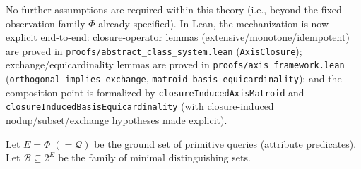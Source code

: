 No further assumptions are required within this theory (i.e., beyond the fixed observation family $\Phi$ already specified). In Lean, the mechanization is now explicit end-to-end: closure-operator lemmas (extensive/monotone/idempotent) are proved in \texttt{proofs/abstract\_class\_system.lean} (\texttt{AxisClosure}); exchange/equicardinality lemmas are proved in \texttt{proofs/axis\_framework.lean} (\texttt{orthogonal\_implies\_exchange}, \texttt{matroid\_basis\_equicardinality}); and the composition point is formalized by \texttt{closureInducedAxisMatroid} and \texttt{closureInducedBasisEquicardinality} (with closure-induced nodup/subset/exchange hypotheses made explicit).

\begin{definition}
Let $E = \Phi\;(=\mathcal{Q})$ be the ground set of primitive queries (attribute predicates). Let $\mathcal{B} \subseteq 2^E$ be the family of minimal distinguishing sets.
\end{definition}

